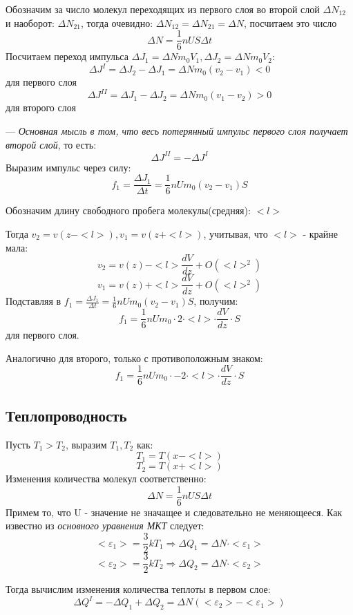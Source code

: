 \documentclass[../main.tex]{subfiles}
\begin{document}
\vspace{5px}

Обозначим за число молекул переходящих из первого слоя во второй слой $\Delta N_{12}$ и наоборот: $\Delta N_{21}$, тогда очевидно: $\Delta N_{12} = \Delta N_{21} = \Delta N$, посчитаем это число
\[\Delta N = \frac{1}{6} n U S \Delta t\]
Посчитаем переход импульса $\Delta J_1 = \Delta N m_0V_1 , \Delta J_2 = \Delta N m_0V_2$:
\[\Delta J^{I} = \Delta J_2 - \Delta J_1 = \Delta N m_0(v_2 - v_1) < 0\]
для первого слоя
\newpage
\[\Delta J^{II} = \Delta J_1 - \Delta J_2 = \Delta N m_0(v_1 - v_2) > 0\]
для второго слоя

\vspace{5px}

--- \textit{Основная мысль в том, что  весь потерянный импульс первого слоя получает второй слой}, то есть:
\[\Delta J^{II} = -\Delta J^{I}\]
Выразим импульс через силу:
\[f_1 = \frac{\Delta J_1}{\Delta t} = \frac{1}{6}nUm_0(v_2 - v_1)S\]

Обозначим длину свободного пробега молекулы(средняя): $<l>$

\vspace{5px}

Тогда $v_2 = v(z - <l>), v_1 = v(z + <l>)$, учитывая, что $<l>$ - крайне мала:
\[v_2 = v(z) - <l>\frac{dV}{dz} + O(<l>^2)\]
\[v_1 = v(z) + <l>\frac{dV}{dz} + O(<l>^2)\]
Подставляя в $f_1 = \frac{\Delta J_1}{\Delta t} = \frac{1}{6}nUm_0(v_2 - v_1)S$, получим:
\[f_1 = \frac{1}{6}nUm_0 \cdot 2 \cdot <l> \cdot \frac{dV}{dz} \cdot S\]
для первого слоя.

\vspace{5px}

Аналогично для второго, только с противоположным знаком:
\[f_1 = \frac{1}{6}nUm_0 \cdot -2 \cdot <l> \cdot \frac{dV}{dz} \cdot S\]

\subsection{Теплопроводность}
Пусть $T_1 > T_2$, выразим $T_1, T_2$ как:
\[T_1 = T(x - <l>)\]
\[T_2 = T(x+<l>)\]
Изменения количества молекул соответственно:
\[\Delta N = \frac{1}{6}nUS\Delta t\]
Примем то, что U - значение не значащее и следовательно не меняющееся. Как известно из \textit{основного уравнения МКТ} следует:
\[<\varepsilon_1> = \frac{3}{2}kT_1 \Rightarrow \Delta Q_1 = \Delta N \cdot <\varepsilon_1>\]
\[<\varepsilon_2> = \frac{3}{2}kT_2 \Rightarrow \Delta Q_2 = \Delta N \cdot <\varepsilon_2>\]

Тогда вычислим изменения количества теплоты в первом слое:
\[ \Delta Q ^{I} = -\Delta Q_1 + \Delta Q_2 = \Delta N(<\varepsilon_2> - <\varepsilon_1>)\]
\end{document}
